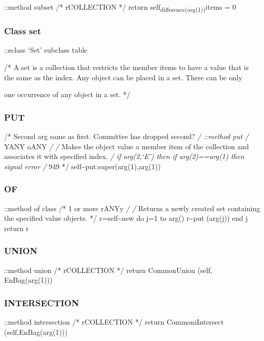 ::method subset /* rCOLLECTION */ return
self\textsubscript{difference(arg(1))}items = 0

\hypertarget{class-set}{%
\subsubsection{Class set}\label{class-set}}

::¢class `Set' subclass table

/* A set is a collection that restricts the member items to have a value
that is the same as the index. Any object can be placed in a set. There
can be only

one occurrence of any object in a set. */

\hypertarget{put-2}{%
\subsubsection{PUT}\label{put-2}}

/* Second arg same as first. Committee has dropped second? \emph{/
::method put /} YANY oANY \emph{/ /} Makes the object value a member
item of the collection and associates it with specified index. \emph{/
if arg(2,`E') then if arg(2)==arg(1) then signal error /} 949 */
self\textasciitilde put:super(arg(1),arg(1))

\hypertarget{of-1}{%
\subsubsection{OF}\label{of-1}}

::method of class /* 1 or more rANYy \emph{/ /} Returns a newly created
set containing the specified value objects. */ r=self\textasciitilde new
do j=1 to arg() r\textasciitilde put (arg(j)) end j return r

\hypertarget{union-1}{%
\subsubsection{UNION}\label{union-1}}

::method union /* rCOLLECTION */ return CommonUnion (self,
EnBag(arg(1)))

\hypertarget{intersection-1}{%
\subsubsection{INTERSECTION}\label{intersection-1}}

::method intersection /* rCOLLECTION */ return CommoniIntersect
(self,EnBag(arg(1)))

